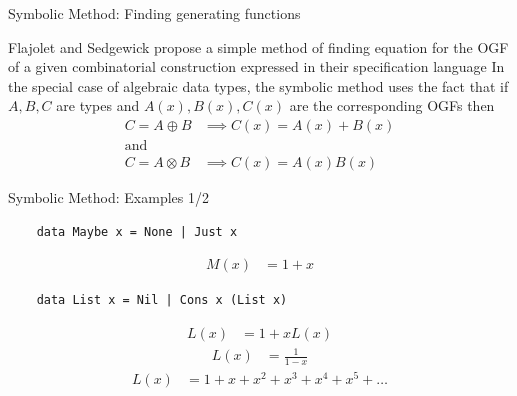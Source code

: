 \documentclass[pdf]{beamer}
\begin{document}
\begin{frame}[fragile]{Symbolic Method: Finding generating functions}
  \begin{outline}
    \1 Flajolet and Sedgewick propose a simple method of finding equation for the OGF of a given combinatorial construction expressed in their specification language
    \1 In the special case of algebraic data types, the symbolic method uses the fact that if $A, B, C$ are types and $A(x), B(x), C(x)$ are the corresponding OGFs then
    \begin{align*}
      C = A \oplus B &\implies C(x) = A(x) + B(x) \\
    \text{and} \\
      C = A \otimes B &\implies C(x) = A(x) B(x)
    \end{align*}
  \end{outline}
\end{frame}

\begin{frame}[fragile]{Symbolic Method: Examples 1/2}
  \begin{verbatim}
    data Maybe x = None | Just x
  \end{verbatim}
  \begin{align*}
    M(x) &= 1 + x
  \end{align*}

  \begin{verbatim}
    data List x = Nil | Cons x (List x)
  \end{verbatim}
  \begin{align*}
    L(x) &= 1 + x L(x)
  \end{align*}
  \begin{align*}
    L(x) &= \frac{1}{1-x}
  \end{align*}
  \begin{align*}
    L(x) &= 1 + x + x^2 + x^3 + x^4 + x^5 + \ldots
  \end{align*}
\end{frame}
\end{document}
